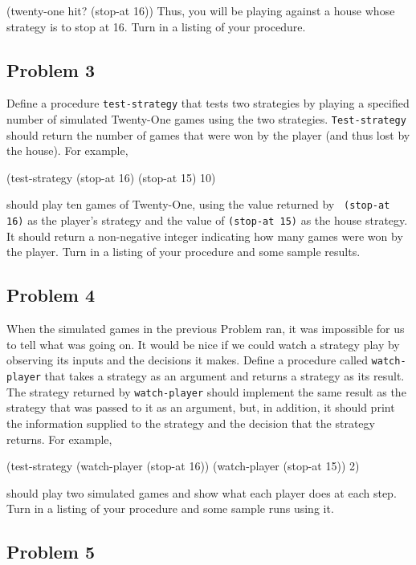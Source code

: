 \beginlisp
(twenty-one hit? (stop-at 16))
\endlisp
Thus, you will be playing against a house whose strategy is to stop at
16.  Turn in a listing of your procedure.

\subsection{Problem 3}

Define a procedure {\tt test-strategy} that tests two strategies by
playing a specified number of simulated Twenty-One games using the two
strategies.  {\tt Test-strategy} should return the number of games
that were won by the player (and thus lost by the house). For example,

\beginlisp
(test-strategy (stop-at 16) (stop-at 15) 10)
\endlisp

\noindent
should play ten games of Twenty-One, using the value returned by {\tt
(stop-at 16)} as the player's strategy and the value of {\tt (stop-at
15)} as the house strategy. It should return a non-negative integer
indicating how many games were won by the player.  Turn in a listing
of your procedure and some sample results.

\subsection{Problem 4}

When the simulated games in the previous Problem ran, it was
impossible for us to tell what was going on.  It would be nice if we
could watch a strategy play by observing its inputs and the decisions
it makes.  Define a procedure called {\tt watch-player} that takes a
strategy as an argument and returns a strategy as its result.  The
strategy returned by {\tt watch-player} should implement the same
result as the strategy that was passed to it as an argument, but, in
addition, it should print the information supplied to the strategy and
the decision that the strategy returns.  For example,

\beginlisp
(test-strategy (watch-player (stop-at 16))
               (watch-player (stop-at 15))
               2)
\endlisp

\noindent
should play two simulated games and show what each player does at each step.
Turn in a listing of your procedure and some sample runs using it.

\subsection{Problem 5}

